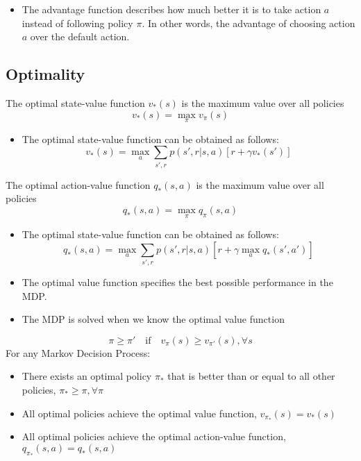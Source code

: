 \begin{itemize}
	\item The advantage function describes how much better it is to take action $a$ instead of following policy $\pi$. In other words, the advantage of choosing action $a$ over the default action.
\end{itemize}

\subsection{Optimality}

\begin{definition}
	The optimal state-value function $v_{*}(s)$ is the maximum value over all policies
	$$v_{*}(s) = \max_{\pi} v_{\pi}(s)$$
\end{definition}

\begin{itemize}
	\item The optimal state-value function can be obtained as follows:
		$$v_{*}(s) = \max_a \sum_{s',r}p(s',r|s,a)[r + \gamma v_*(s')]$$
\end{itemize}

\begin{definition}
	The optimal action-value function $q_{*}(s, a)$ is the maximum value over all policies
	$$q_{*}(s,a) = \max_{\pi} q_{\pi}(s,a)$$
\end{definition}
\begin{itemize}
	\item The optimal state-value function can be obtained as follows:
		$$q_{*}(s,a) = \max_a \sum_{s',r}p(s',r|s,a)[r + \gamma \max_a q_*(s',a')]$$
	\item The optimal value function specifies the best possible performance in the MDP.
	\item The MDP is solved when we know the optimal value function
\end{itemize}

\begin{theorem}
	$$\pi\geq \pi' \quad\textrm{if}\quad v_\pi(s) \geq v_{\pi'}(s), \forall s$$
	For any Markov Decision Process:
	\begin{itemize}
		\item There exists an optimal policy $\pi_*$ that is better than or equal to all other policies, $\pi_*\geq \pi, \forall \pi$
		\item All optimal policies achieve the optimal value function, $v_{\pi_*}(s) = v_*(s)$
		\item All optimal policies achieve the optimal action-value function, $q_{\pi_*}(s,a) = q_{*}(s,a)$
	\end{itemize}
\end{theorem}

